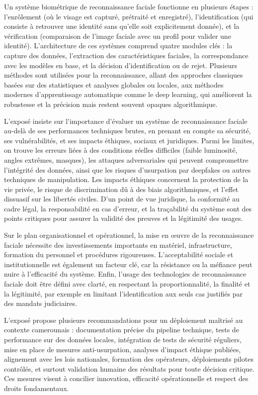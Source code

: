 \documentclass[11pt,a4paper]{article}
\begin{document}
	Un système biométrique de reconnaissance faciale fonctionne en plusieurs étapes : l’enrôlement (où le visage est capturé, prétraité et enregistré), l’identification (qui consiste à retrouver une identité sans qu’elle soit explicitement donnée), et la vérification (comparaison de l’image faciale avec un profil pour valider une identité). L’architecture de ces systèmes comprend quatre modules clés : la capture des données, l’extraction des caractéristiques faciales, la correspondance avec les modèles en base, et la décision d’identification ou de rejet. Plusieurs méthodes sont utilisées pour la reconnaissance, allant des approches classiques basées sur des statistiques et analyses globales ou locales, aux méthodes modernes d’apprentissage automatique comme le deep learning, qui améliorent la robustesse et la précision mais restent souvent opaques algorithmique.
	
	L’exposé insiste sur l’importance d’évaluer un système de reconnaissance faciale au-delà de ses performances techniques brutes, en prenant en compte sa sécurité, ses vulnérabilités, et ses impacts éthiques, sociaux et juridiques. Parmi les limites, on trouve les erreurs liées à des conditions réelles difficiles (faible luminosité, angles extrêmes, masques), les attaques adversariales qui peuvent compromettre l’intégrité des données, ainsi que les risques d’usurpation par deepfakes ou autres techniques de manipulation. Les impacts éthiques concernent la protection de la vie privée, le risque de discrimination dû à des biais algorithmiques, et l’effet dissuasif sur les libertés civiles. D’un point de vue juridique, la conformité au cadre légal, la responsabilité en cas d’erreur, et la traçabilité du système sont des points critiques pour assurer la validité des preuves et la légitimité des usages.
	
	Sur le plan organisationnel et opérationnel, la mise en œuvre de la reconnaissance faciale nécessite des investissements importants en matériel, infrastructure, formation du personnel et procédures rigoureuses. L’acceptabilité sociale et institutionnelle est également un facteur clé, car la résistance ou la méfiance peut nuire à l’efficacité du système. Enfin, l’usage des technologies de reconnaissance faciale doit être défini avec clarté, en respectant la proportionnalité, la finalité et la légitimité, par exemple en limitant l’identification aux seuls cas justifiés par des mandats judiciaires.
	
	L’exposé propose plusieurs recommandations pour un déploiement maîtrisé au contexte camerounais : documentation précise du pipeline technique, tests de performance sur des données locales, intégration de tests de sécurité réguliers, mise en place de mesures anti-usurpation, analyses d’impact éthique publiées, alignement avec les lois nationales, formation des opérateurs, déploiements pilotes contrôlés, et surtout validation humaine des résultats pour toute décision critique. Ces mesures visent à concilier innovation, efficacité opérationnelle et respect des droits fondamentaux.
	
\end{document}
